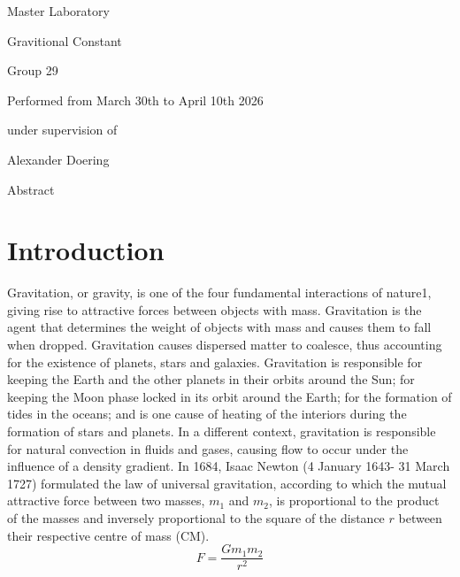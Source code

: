 \documentclass{article}
\begin{document}
\begin{center}
Master Laboratory

Gravitional Constant

Group 29

Performed from March 30th to April 10th 2026

under supervision of

Alexander Doering

Abstract
    
\end{center}
\newpage
\tableofcontents
\newpage
\section{Introduction}

\label{sec: intro}
Gravitation, or gravity, is one of the four fundamental interactions
of nature1, giving rise to attractive forces between objects with mass. Gravitation is the agent
that determines the weight of
objects with mass and causes them to fall when dropped.
Gravitation causes dispersed matter to coalesce, thus accounting
for the existence of planets, stars and galaxies. Gravitation is
responsible for keeping the Earth and the other planets in their
orbits around the Sun; for keeping the Moon
phase locked in its orbit around the Earth; for the formation of tides
in the oceans; and is one
cause of heating of the interiors during the formation of stars and
planets. In a different context,
gravitation is responsible for natural convection in fluids and gases,
causing flow to occur under
the influence of a density gradient.
In 1684, Isaac Newton (4 January 1643- 31 March 1727) formulated the
law of universal gravitation, according to which the mutual attractive
force between two masses, $m_1$ and $m_2$, is proportional to the
product of the masses and inversely proportional to the square of the
distance $r$
between their respective centre of mass (CM).
\begin{equation}
F =\frac{G m_1 m_2}{r^2}
\end{equation}
\newpage
\end{document}
